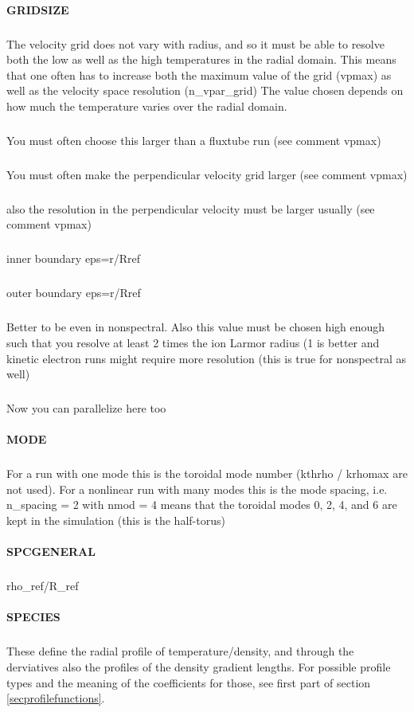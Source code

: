 \paragraph{GRIDSIZE}
\subparagraph{} The velocity grid does not vary with radius, 
and so it must be able to resolve both the low 
as well as the high temperatures in the radial 
domain. This means that one often has to increase 
both the maximum value of the grid (vpmax) as 
well as the velocity space resolution (n_vpar_grid)
The value chosen depends on how much the temperature 
varies over the radial domain.
\subparagraph{} You must often choose this larger than a fluxtube 
run (see comment vpmax)
\subparagraph{} You must often make the perpendicular velocity 
grid larger (see comment vpmax) 
\subparagraph{} also the resolution in the perpendicular velocity
must be larger usually (see comment vpmax)
\subparagraph{} inner boundary eps=r/Rref
\subparagraph{} outer boundary eps=r/Rref
\subparagraph{} Better to be even in nonspectral. Also this value 
must be chosen high enough such that you resolve 
at least 2 times the ion Larmor radius (1 is better
and kinetic electron runs might require more 
resolution (this is true for nonspectral as well) 
\subparagraph{} Now you can parallelize here too

\paragraph{MODE}
\subparagraph{} For a run with one mode this is the toroidal mode 
number (kthrho / krhomax are not used). For a 
nonlinear run with many modes this is the mode 
spacing, i.e. n_spacing = 2 with nmod = 4 means 
that the toroidal modes 0, 2, 4, and 6 are kept 
in the simulation (this is the half-torus) 

\paragraph{SPCGENERAL}
\subparagraph{} rho_ref/R_ref

\paragraph{SPECIES}
\subparagraph{}
\subparagraph{}
\subparagraph{}
\subparagraph{}
These define the radial profile of temperature/density, and through the
derviatives also the profiles of the density gradient lengths. For possible
profile types and the meaning of the coefficients for those, see first part of
section \ref{secprofilefunctions}.

